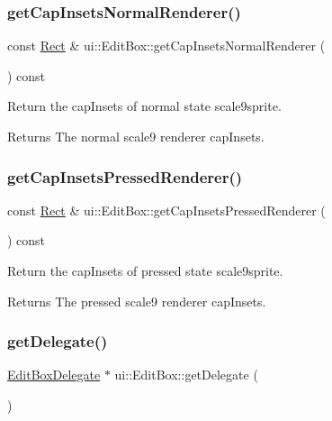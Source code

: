 \subsubsection{\texorpdfstring{get\+Cap\+Insets\+Normal\+Renderer()}{getCapInsetsNormalRenderer()}}
{\footnotesize\ttfamily const \hyperlink{classRect}{Rect} \& ui\+::\+Edit\+Box\+::get\+Cap\+Insets\+Normal\+Renderer (\begin{DoxyParamCaption}{ }\end{DoxyParamCaption}) const}

Return the cap\+Insets of normal state scale9sprite. \begin{DoxyReturn}{Returns}
The normal scale9 renderer cap\+Insets. 
\end{DoxyReturn}
\mbox{\label{classui_1_1EditBox_a3cc0390e788f6b8da345877c424d0c1d}} 
\subsubsection{\texorpdfstring{get\+Cap\+Insets\+Pressed\+Renderer()}{getCapInsetsPressedRenderer()}}
{\footnotesize\ttfamily const \hyperlink{classRect}{Rect} \& ui\+::\+Edit\+Box\+::get\+Cap\+Insets\+Pressed\+Renderer (\begin{DoxyParamCaption}{ }\end{DoxyParamCaption}) const}

Return the cap\+Insets of pressed state scale9sprite. \begin{DoxyReturn}{Returns}
The pressed scale9 renderer cap\+Insets. 
\end{DoxyReturn}
\mbox{\label{classui_1_1EditBox_ab4a844e7a6c92162370cf1bba2f60bdb}} 
\subsubsection{\texorpdfstring{get\+Delegate()}{getDelegate()}\hspace{0.1cm}{\footnotesize\ttfamily [1/2]}}
{\footnotesize\ttfamily \hyperlink{classui_1_1EditBoxDelegate}{Edit\+Box\+Delegate} $\ast$ ui\+::\+Edit\+Box\+::get\+Delegate (\begin{DoxyParamCaption}{ }\end{DoxyParamCaption})}

